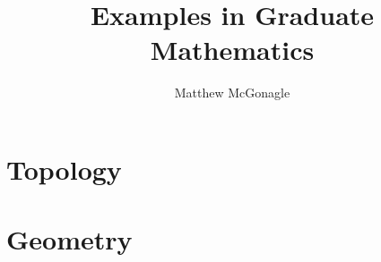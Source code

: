 \documentclass{article}
\title{Examples in Graduate Mathematics}
\author{Matthew McGonagle}
\begin{document}
\maketitle

\tableofcontents

\section{Topology}



\section{Geometry}


{}

\end{document}
